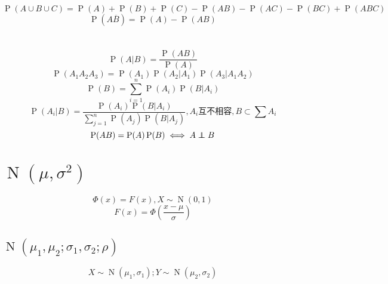 \documentclass[]{article}
\numberwithin{equation}{section}
\DeclareMathOperator{\N}{N}
\newcommand\independent{\protect\mathpalette{\protect\independenT}{\perp}}
\def\independenT#1#2{\mathrel{\rlap{$#1#2$}\mkern2mu{#1#2}}}
\begin{document}
\section{}
\begin{equation}
    \operatorname{P}(A\cup B\cup C)=\operatorname{P}(A)+\operatorname{P}(B)+\operatorname{P}(C)-\operatorname{P}(AB)-\operatorname{P}(AC)-\operatorname{P}(BC)+\operatorname{P}(ABC)
\end{equation}
\begin{equation}
    \operatorname{P}(A\overline{B})=\operatorname{P}(A)-\operatorname{P}(AB)
\end{equation}

\section{}
\begin{equation}
    \operatorname{P}(A|B)=\frac{\operatorname{P}(AB)}{\operatorname{P}(A)}
\end{equation}
\begin{equation}
    \operatorname{P}(A_1A_2A_3)=\operatorname{P}(A_1)\operatorname{P}(A_2|A_1)\operatorname{P}(A_3|A_1A_2)
\end{equation}
\begin{equation}
    \operatorname{P}(B)=\sum\limits_{i=1}^n\operatorname{P}(A_i)\operatorname{P}(B|A_i)
\end{equation}
\begin{equation}
    \operatorname{P}(A_i|B)=\frac{\operatorname{P}(A_i)\operatorname{P}(B|A_i)}{\sum\limits_{j=1}^n\operatorname{P}(A_j)\operatorname{P}(B|A_j)},A_i\text{互不相容},B\subset \sum A_i
\end{equation}
\begin{equation}
    \operatorname{P}(AB)=\operatorname{P}(A)\operatorname{P}(B)\iff A\independent B
\end{equation}

\section{$\N(\mu,\sigma^2)$}
\begin{equation}
    \Phi(x)=F(x),X\sim\N(0,1)
\end{equation}
\begin{equation}
    F(x)=\Phi(\frac{x-\mu}{\sigma})
\end{equation}
\subsection{$\N(\mu_1,\mu_2;\sigma_1,\sigma_2;\rho)$}
\begin{equation}
    X\sim\N(\mu_1,\sigma_1);Y\sim\N(\mu_2,\sigma_2)
\end{equation}
\end{document}
